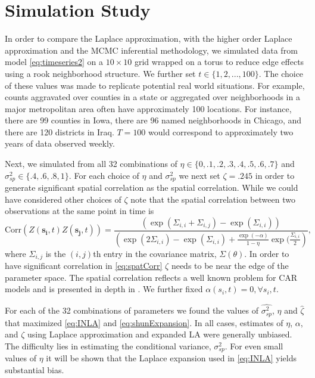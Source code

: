 \documentclass[11pt]{isuthesis}
\begin{document}
	
	\section{Simulation Study}
	
	In order to compare the Laplace approximation, with the higher order Laplace approximation and the MCMC inferential methodology, we simulated data from model \eqref{eq:timeseries2} on a $10 \times 10$ grid wrapped on a torus to reduce edge effects using a rook neighborhood structure.  We further set $t \in \{1,2,...,100\}$.  The choice of these values was made to replicate potential real world situations.  For example, counts aggravated over counties in a state or aggregated over neighborhoods in a major metropolitan area often have approximately 100 locations.  For instance, there are 99 counties in Iowa, there are 96 named neighborhoods in Chicago, and there are 120 districts in Iraq.  $T=100$ would correspond to approximately two years of data observed weekly.
	
	
	Next, we simulated from all 32 combinations of $\eta \in \{0,.1,.2,.3,.4,.5,.6,.7\}$ and $\sigma_{sp}^2 \in \{.4,.6,.8,1\}$.  For each choice of $\eta$ and $\sigma_{sp}^2$ we next set $\zeta=.245$ in order to generate significant spatial correlation as the spatial correlation.  While we could have considered other choices of $\zeta$ note that the spatial correlation between two observations at the same point in time is
	\begin{equation}
	\mbox{Corr}(Z(\boldsymbol{s_i},t)Z(\boldsymbol{s_j},t))  = \frac{\left(\exp(\Sigma_{i,i}+\Sigma_{i,j}) -\exp(\Sigma_{i,i})\right)}{\left(\exp(2\Sigma_{i,i}) -\exp(\Sigma_{i,i}) + \frac{\exp(-\alpha)}{1-\eta}\exp(\frac{\Sigma_{i,i}}{2}\right)}\label{eq:spatCorr},
	\end{equation}
	where $\Sigma_{i,j}$ is the $(i,j)$th entry in the covariance matrix, $\Sigma(\theta)$.  In order to have significant correlation in \eqref{eq:spatCorr} $\zeta$ needs to be near the edge of the parameter space.  The spatial correlation reflects a well known problem for CAR models and is presented in depth in \cite{wall2004close}.  We further fixed $\alpha(s_i,t)=0,\forall s_i,t$. 
	
	For each of the 32 combinations of parameters we found the values of $\hat{\sigma_{sp}^2}$, $\hat{\eta}$ and $\hat{\zeta}$ that maximized \eqref{eq:INLA} and \eqref{eq:shunExpansion}.  In all cases, estimates of $\eta$, $\alpha$, and $\zeta$ using Laplace approximation and expanded LA were generally unbiased.  The difficulty lies in estimating the conditional variance, $\sigma_{sp}^2$.  For even small values of $\eta$ it will be shown that the Laplace expansion used in \eqref{eq:INLA} yields substantial bias.
	
\end{document}
